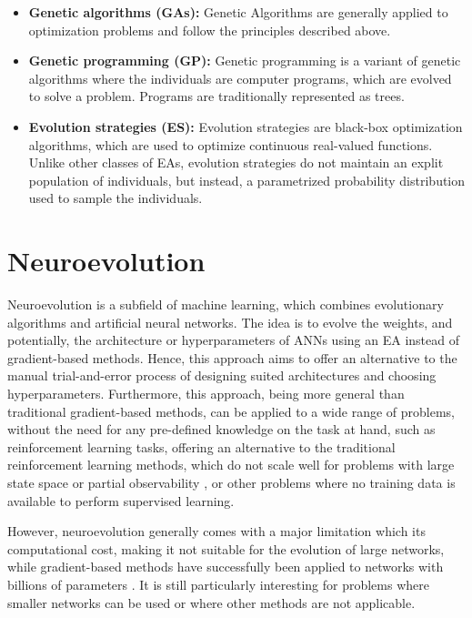 \begin{itemize}
    \item \textbf{Genetic algorithms (GAs):} Genetic Algorithms \cite{genetic_alg,genetic_alg_review} are generally applied to optimization problems and follow the principles described above.
    \item \textbf{Genetic programming (GP):} Genetic programming \cite{cartesian_gp} is a variant of genetic algorithms where the individuals are computer programs, which are evolved to
        solve a problem. Programs are traditionally represented as trees.
    \item \textbf{Evolution strategies (ES):} Evolution strategies \cite{es_intro} are black-box optimization algorithms, which are used to optimize continuous real-valued functions.
        Unlike other classes of EAs, evolution strategies do not maintain an explit population of individuals, but instead, a parametrized probability distribution
        used to sample the individuals.
\end{itemize}

\section{Neuroevolution}

Neuroevolution is a subfield of machine learning, which combines evolutionary algorithms and artificial neural networks. The idea is to evolve the weights,
and potentially, the architecture or hyperparameters of ANNs using an EA instead of gradient-based methods. Hence, this approach aims to
offer an alternative to the manual trial-and-error process of designing suited architectures and choosing hyperparameters. Furthermore, this approach,
being more general than traditional gradient-based methods, can be applied to a wide range of problems, without the need for any pre-defined knowledge on the task
at hand, such as reinforcement learning tasks, offering an alternative to the traditional reinforcement learning methods, which do not scale well for problems with large
state space or partial observability \cite{challenges_of_rl,rl_control}, or other problems where no training data is available to perform supervised learning.

However, neuroevolution generally comes with a major limitation which its computational cost, making it not suitable for the evolution of large networks,
while gradient-based methods have successfully been applied to networks with billions of parameters \cite{llama3}.
It is still particularly interesting for problems where smaller networks can be used or where other methods are not applicable.

